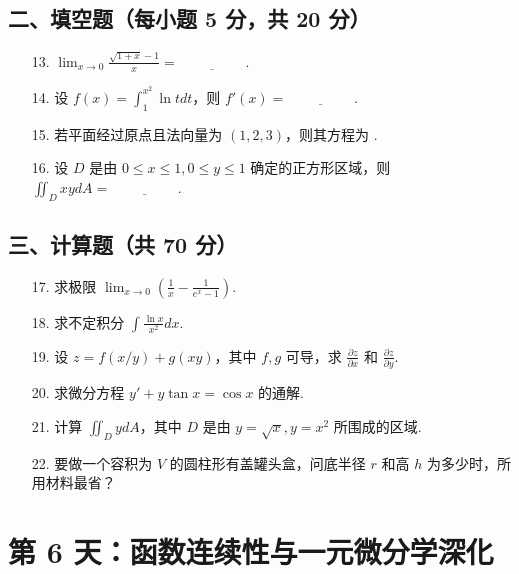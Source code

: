 \documentclass[11pt,a4paper]{article}
\begin{document}
\subsection*{二、填空题（每小题 5 分，共 20 分）}
\begin{enumerate}
    \item[13.] $\lim_{x \to 0} \frac{\sqrt{1+x}-1}{x} = \underline{\hspace{2cm}}$.
    \item[14.] 设 $f(x) = \int_1^{x^2} \ln t dt$，则 $f'(x) = \underline{\hspace{2cm}}$.
    \item[15.] 若平面经过原点且法向量为 $(1, 2, 3)$，则其方程为 \underline{\hspace{2cm}}.
    \item[16.] 设 $D$ 是由 $0 \le x \le 1, 0 \le y \le 1$ 确定的正方形区域，则 $\iint_D xy dA = \underline{\hspace{2cm}}$.
\end{enumerate}
\subsection*{三、计算题（共 70 分）}
\begin{enumerate}
    \item[17.] 求极限 $\lim_{x \to 0} \left( \frac{1}{x} - \frac{1}{e^x-1} \right)$.
    \item[18.] 求不定积分 $\int \frac{\ln x}{x^2} dx$.
    \item[19.] 设 $z = f(x/y) + g(xy)$，其中 $f, g$ 可导，求 $\frac{\partial z}{\partial x}$ 和 $\frac{\partial z}{\partial y}$.
    \item[20.] 求微分方程 $y' + y \tan x = \cos x$ 的通解.
    \item[21.] 计算 $\iint_D y dA$，其中 $D$ 是由 $y = \sqrt{x}, y=x^2$ 所围成的区域.
    \item[22.] 要做一个容积为 $V$ 的圆柱形有盖罐头盒，问底半径 $r$ 和高 $h$ 为多少时，所用材料最省？
\end{enumerate}

\newpage

\section*{第 6 天：函数连续性与一元微分学深化}
\end{document}
